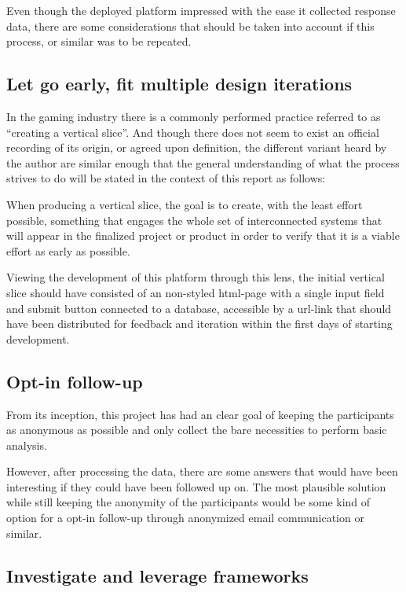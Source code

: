   Even though the deployed platform impressed with the ease it collected
  response data, there are some considerations that should be taken into
  account if this process, or similar was to be repeated.

  \subsection{Let go early, fit multiple design iterations}

  In the gaming industry there is a commonly performed practice referred to as
  ``creating a vertical slice''. And though there does not seem to exist an
  official recording of its origin, or agreed upon definition, the different
  variant heard by the author are similar enough that the general understanding
  of what the process strives to do will be stated in the context of this
  report as follows:

  When producing a vertical slice, the goal is to create, with the least effort
  possible, something that engages the whole set of interconnected systems that
  will appear in the finalized project or product in order to verify that it is
  a viable effort as early as possible.

  Viewing the development of this platform through this lens, the initial vertical
  slice should have consisted of an non-styled html-page with a single input
  field and submit button connected to a database, accessible by a url-link
  that should have been distributed for feedback and iteration within the first
  days of starting development.

  \subsection{Opt-in follow-up}

  From its inception, this project has had an clear goal of keeping the
  participants as anonymous as possible and only collect the bare necessities
  to perform basic analysis.

  However, after processing the data, there are some answers that would have
  been interesting if they could have been followed up on. The most plausible
  solution while still keeping the anonymity of the participants would be some
  kind of option for a opt-in follow-up through anonymized email communication
  or similar.

  \subsection{Investigate and leverage frameworks}

